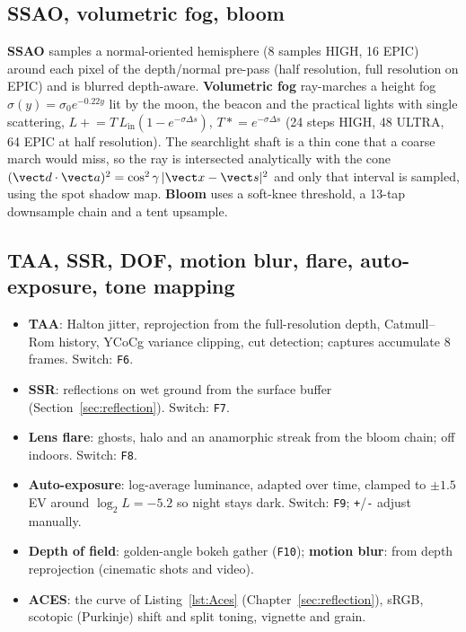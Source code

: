\subsection{SSAO, volumetric fog, bloom}
\textbf{SSAO} samples a normal-oriented hemisphere (8 samples HIGH, 16 EPIC) around each pixel of the depth/normal
pre-pass (half resolution, full resolution on EPIC) and is blurred depth-aware. \textbf{Volumetric fog} ray-marches a
height fog $\sigma(y)=\sigma_0e^{-0.22y}$ lit by the moon, the beacon and the practical lights with single
scattering, $L\mathrel{+}=T\,L_\text{in}(1-e^{-\sigma\Delta s})$, $T\mathrel{*}=e^{-\sigma\Delta s}$ (24 steps HIGH, 48
ULTRA, 64 EPIC at half resolution). The searchlight shaft is a thin cone that a coarse march would miss, so the ray is
intersected analytically with the cone $(\vect d\cdot\vect a)^2=\cos^2\gamma\,|\vect x-\vect s|^2$ and only that
interval is sampled, using the spot shadow map. \textbf{Bloom} uses a soft-knee threshold, a 13-tap downsample chain and a tent upsample.

\subsection{TAA, SSR, DOF, motion blur, flare, auto-exposure, tone mapping}
\begin{itemize}
  \item \textbf{TAA}: Halton jitter, reprojection from the full-resolution depth, Catmull--Rom history, YCoCg variance
  clipping, cut detection; captures accumulate 8 frames. Switch: \texttt{F6}.
  \item \textbf{SSR}: reflections on wet ground from the surface buffer (Section~\ref{sec:reflection}). Switch: \texttt{F7}.
  \item \textbf{Lens flare}: ghosts, halo and an anamorphic streak from the bloom chain; off indoors. Switch: \texttt{F8}.
  \item \textbf{Auto-exposure}: log-average luminance, adapted over time, clamped to $\pm1.5$\,EV around $\log_2 L=-5.2$ so night stays dark. Switch: \texttt{F9}; \texttt{+}/\texttt{-} adjust manually.
  \item \textbf{Depth of field}: golden-angle bokeh gather (\texttt{F10}); \textbf{motion blur}: from depth reprojection (cinematic shots and video).
  \item \textbf{ACES}: the curve of Listing~\ref{lst:Aces} (Chapter~\ref{sec:reflection}), sRGB, scotopic (Purkinje) shift and split toning, vignette and grain.
\end{itemize}

